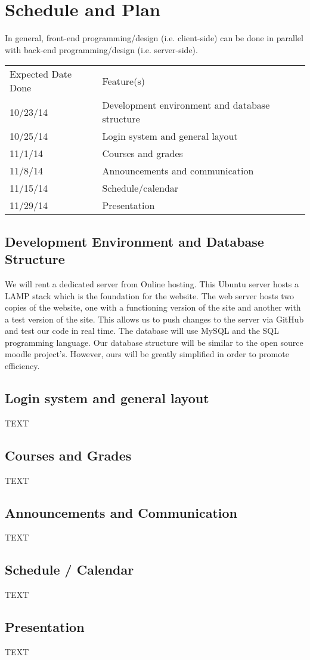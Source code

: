 \documentclass{article}
\begin{document}
\section{Schedule and Plan}

In general, front-end programming/design (i.e. client-side) can be done in
parallel with back-end programming/design (i.e. server-side).

\vspace{10 pt}

\begin{tabular}{ll}
    Expected Date Done&Feature(s)\\
    10/23/14&Development environment and database structure\\
    10/25/14&Login system and general layout\\
    11/1/14&Courses and grades\\
    11/8/14&Announcements and communication\\
    11/15/14&Schedule/calendar\\
    11/29/14&Presentation\\
\end{tabular}

\subsection{Development Environment and Database Structure}

We will rent a dedicated server from Online hosting. This Ubuntu server hosts a LAMP stack which is the foundation for the website. The web server hosts two copies of the website, one with a functioning version of the site and another with a test version of the site. This allows us to push changes to the server via GitHub and test our code in real time.
The database will use MySQL and the SQL programming language. Our database structure will be similar to the open source moodle project's. However, ours will be greatly simplified in order to promote efficiency.

\subsection{Login system and general layout}

TEXT

\subsection{Courses and Grades}

TEXT

\subsection{Announcements and Communication}

TEXT

\subsection{Schedule / Calendar}

TEXT

\subsection{Presentation}

TEXT

{}

\end{document}
